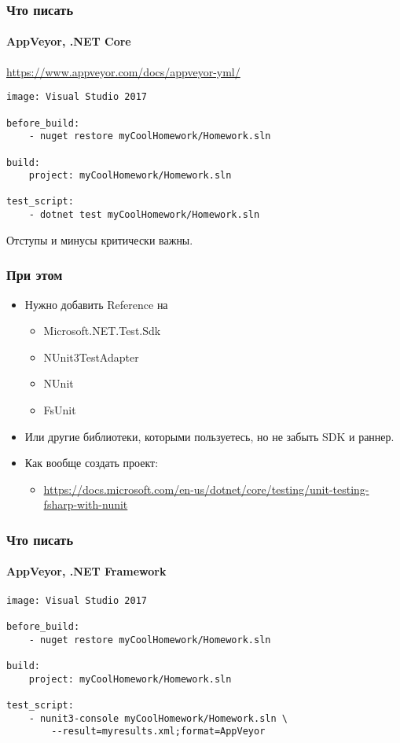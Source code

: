 \documentclass[xetex,mathserif,serif]{beamer}
\begin{document}
	\begin{frame}[fragile]
		\frametitle{Что писать}
		\framesubtitle{AppVeyor, .NET Core}
		\url{https://www.appveyor.com/docs/appveyor-yml/}
		\begin{verbatim}
image: Visual Studio 2017 

before_build: 
    - nuget restore myCoolHomework/Homework.sln

build: 
    project: myCoolHomework/Homework.sln

test_script: 
    - dotnet test myCoolHomework/Homework.sln
		\end{verbatim}
		Отступы и минусы критически важны.
	\end{frame}

	\begin{frame}
		\frametitle{При этом}
		\begin{itemize}
			\item Нужно добавить Reference на
			\begin{itemize}
				\item Microsoft.NET.Test.Sdk
				\item NUnit3TestAdapter
				\item NUnit
				\item FsUnit
			\end{itemize}
			\item Или другие библиотеки, которыми пользуетесь, но не забыть SDK и раннер.
			\item Как вообще создать проект:
			\begin{itemize}
				\item \url{https://docs.microsoft.com/en-us/dotnet/core/testing/unit-testing-fsharp-with-nunit}
			\end{itemize}
		\end{itemize}
	\end{frame}

	\begin{frame}[fragile]
		\frametitle{Что писать}
		\framesubtitle{AppVeyor, .NET Framework}
		\begin{verbatim}
image: Visual Studio 2017 

before_build: 
    - nuget restore myCoolHomework/Homework.sln

build: 
    project: myCoolHomework/Homework.sln

test_script: 
    - nunit3-console myCoolHomework/Homework.sln \ 
        --result=myresults.xml;format=AppVeyor
		\end{verbatim}
	\end{frame}
\end{document}
